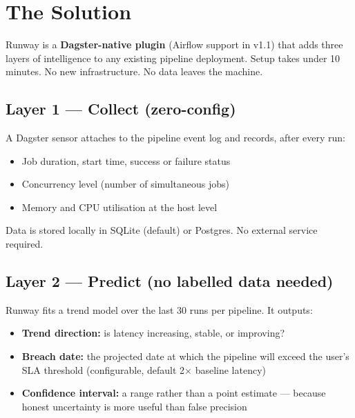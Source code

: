 
\section{The Solution}

Runway is a \textbf{Dagster-native plugin} (Airflow support in v1.1) that adds three layers
of intelligence to any existing pipeline deployment. Setup takes under 10 minutes.
No new infrastructure. No data leaves the machine.

\subsection{Layer 1 — Collect (zero-config)}

A Dagster sensor attaches to the pipeline event log and records, after every run:

\begin{itemize}
  \item Job duration, start time, success or failure status
  \item Concurrency level (number of simultaneous jobs)
  \item Memory and CPU utilisation at the host level
\end{itemize}

Data is stored locally in SQLite (default) or Postgres. No external service required.

\subsection{Layer 2 — Predict (no labelled data needed)}

Runway fits a trend model over the last 30 runs per pipeline. It outputs:

\begin{itemize}
  \item \textbf{Trend direction:} is latency increasing, stable, or improving?
  \item \textbf{Breach date:} the projected date at which the pipeline will exceed the user's SLA threshold (configurable, default 2× baseline latency)
  \item \textbf{Confidence interval:} a range rather than a point estimate — because honest uncertainty is more useful than false precision
\end{itemize}

